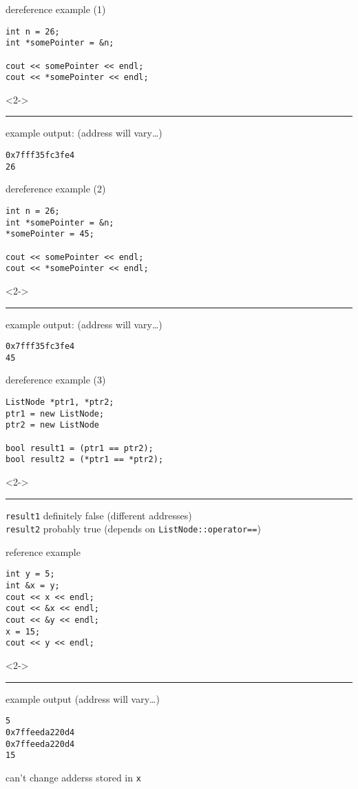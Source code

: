 \begin{frame}[fragile,label=derefEx1]{dereference example (1)}
\lstset{language=C++,style=small}
\begin{lstlisting}
int n = 26;
int *somePointer = &n;

cout << somePointer << endl;
cout << *somePointer << endl;
\end{lstlisting}
\begin{visibleenv}<2->
\hrule
example output: (address will vary\ldots)
\begin{Verbatim}
0x7fff35fc3fe4
26
\end{Verbatim}
\end{visibleenv}
\end{frame}

\begin{frame}[fragile,label=derefEx2]{dereference example (2)}
\lstset{language=C++,style=small}
\begin{lstlisting}
int n = 26;
int *somePointer = &n;
*somePointer = 45;

cout << somePointer << endl;
cout << *somePointer << endl;
\end{lstlisting}
\begin{visibleenv}<2->
\hrule
example output: (address will vary\ldots)
\begin{Verbatim}
0x7fff35fc3fe4
45
\end{Verbatim}
\end{visibleenv}
\end{frame}

\begin{frame}[fragile,label=derefEx3]{dereference example (3)}
\lstset{language=C++,style=small}
\begin{lstlisting}
ListNode *ptr1, *ptr2;
ptr1 = new ListNode;
ptr2 = new ListNode

bool result1 = (ptr1 == ptr2);
bool result2 = (*ptr1 == *ptr2);

\end{lstlisting}
\begin{visibleenv}<2->
\hrule
\texttt{result1} definitely false (different addresses) \\
\texttt{result2} probably true (depends on \lstinline|ListNode::operator==|) 
\end{visibleenv}
\end{frame}

\begin{frame}[fragile,label=refEx]{reference example}
\lstset{language=C++,style=small}
\begin{lstlisting}
int y = 5;
int &x = y;
cout << x << endl;
cout << &x << endl;
cout << &y << endl;
x = 15;
cout << y << endl;
\end{lstlisting}
\begin{visibleenv}<2->
\hrule
example output (address will vary\ldots)
\begin{Verbatim}
5
0x7ffeeda220d4
0x7ffeeda220d4
15
\end{Verbatim}
can't change adderss stored in \texttt{x}
\end{visibleenv}
\end{frame}

